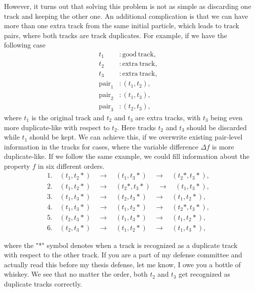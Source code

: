 However, it turns out that solving this problem is not as simple as discarding one track and keeping the other one. An additional complication is that we can have more than one extra track from the same initial particle, which leads to track pairs, where both tracks are track duplicates. For example, if we have the following case
\begin{align*}
t_1&: \mathrm{good~track},\\
t_2&: \mathrm{extra~track},\\
t_3&: \mathrm{extra~track},\\
\mathrm{pair}_1&:\left(t_1,t_2\right),\\
\mathrm{pair}_2&:\left(t_1,t_3\right),\\
\mathrm{pair}_3&:\left(t_2,t_3\right),
\end{align*}
where $t_1$ is the original track and $t_2$ and $t_3$ are extra tracks, with $t_3$ being even more duplicate-like with respect to $t_2$. Here tracks $t_2$ and $t_3$ should be discarded while $t_1$ should be kept. We can achieve this, if we overwrite existing pair-level information in the tracks for cases, where the variable difference $\Delta f$ is more duplicate-like. If we follow the same example, we could fill information about the property $f$ in six different orders. 
\begin{align*}
1.&~\left(t_1,t_2*\right)\quad \to \quad \left(t_1,t_3*\right)\quad \to \quad \left(t_2*,t_3*\right),\\ 
2.&~\left(t_1,t_2*\right)\quad \to \quad \left(t_2*,t_3*\right)\quad \to \quad \left(t_1,t_3*\right),\\ 
3.&~\left(t_1,t_3*\right)\quad \to \quad \left(t_2,t_3*\right)\quad \to \quad \left(t_1,t_2*\right),\\
4.&~\left(t_1,t_3*\right)\quad \to \quad \left(t_1,t_2*\right)\quad \to \quad \left(t_2*,t_3*\right),\\
5.&~\left(t_2,t_3*\right)\quad \to \quad \left(t_1,t_3*\right)\quad \to \quad \left(t_1,t_2*\right),\\
6.&~\left(t_2,t_3*\right)\quad \to \quad \left(t_1,t_2*\right)\quad \to \quad \left(t_1,t_3*\right),
\end{align*}

where the "*" symbol denotes when a track is recognized as a duplicate track with respect to the other track. If you are a part of my defense committee and actually read this before my thesis defense, let me know, I owe you a bottle of whiskey. We see that no matter the order, both $t_2$ and $t_3$ get recognized as duplicate tracks correctly.

